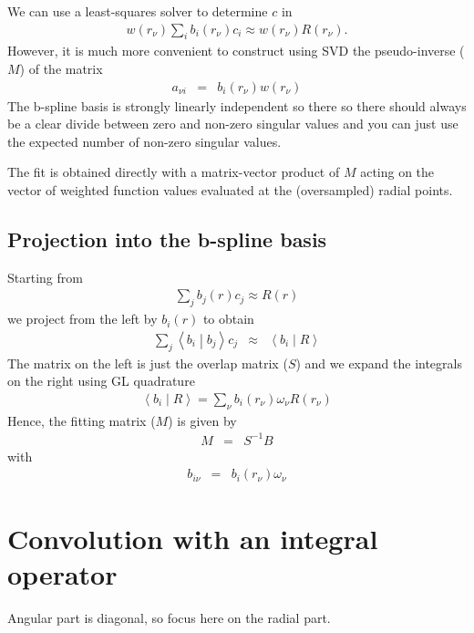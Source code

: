 \documentclass[12pt]{article}
\begin{document}
We can use a least-squares solver to determine $c$ in
\begin{eqnarray}
  w(r_\nu) \sum_i b_i(r_\nu) c_i \approx w(r_\nu) R(r_\nu).
\end{eqnarray}
However, it is much more convenient to construct using SVD the pseudo-inverse ($M$) of the matrix
\begin{eqnarray}
 a_{\nu i} & = & b_i(r_\nu) w(r_\nu) 
\end{eqnarray}
The b-spline basis is strongly linearly independent so there so there should always be a clear divide between zero and non-zero singular values and you can just use the expected number of non-zero singular values.

The fit is obtained directly with a matrix-vector product of $M$ acting on the vector of weighted function values evaluated at the (oversampled) radial points.

\subsection{Projection into the b-spline basis}

Starting from 
\begin{eqnarray}
  \sum_j b_j(r) c_j \approx R(r)
\end{eqnarray}
we project from the left by $b_i(r)$ to obtain
\begin{eqnarray}
  \sum_j \left\langle b_i \middle| b_j\right\rangle c_j & \approx & \left\langle b_i \middle| R \right\rangle
\end{eqnarray}
The matrix on the left is just the overlap matrix ($S$) and we expand the integrals on the right using GL quadrature
\begin{eqnarray}
\left\langle b_i \middle| R \right\rangle = \sum_\nu b_i(r_\nu) \omega_\nu  R(r_\nu)
\end{eqnarray}
Hence, the fitting matrix ($M$) is given by
\begin{eqnarray}
   M & = & S^{-1} B
\end{eqnarray}
with
\begin{eqnarray}
  b_{i \nu} & = & b_i(r_\nu) \omega_\nu 
\end{eqnarray}

\section{Convolution with an integral operator}

Angular part is diagonal, so focus here on the radial part.
\end{document}
